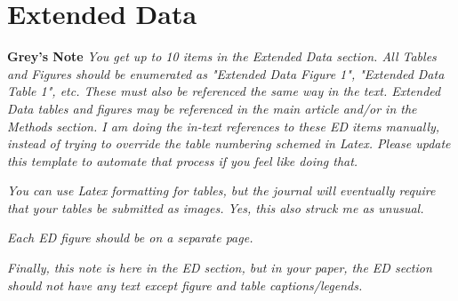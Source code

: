 \documentclass[pdflatex]{sn-jnl}
\begin{document}
\newpage
\section*{Extended Data}
\textbf{Grey's Note} \textit{You get up to 10 items in the Extended Data section. All Tables and Figures should be enumerated as "Extended Data Figure 1", "Extended Data Table 1", etc. These must also be referenced the same way in the text. Extended Data tables and figures may be referenced in the main article and/or in the Methods section. I am doing the in-text references to these ED items manually, instead of trying to override the table numbering schemed in Latex. Please update this template to automate that process if you feel like doing that.}

\textit{You can use Latex formatting for tables, but the journal will eventually require that your tables be submitted as images. Yes, this also struck me as unusual.}

\textit{Each ED figure should be on a separate page.}

\textit{Finally, this note is here in the ED section, but in your paper, the ED section should not have any text except figure and table captions/legends.}
\end{document}
